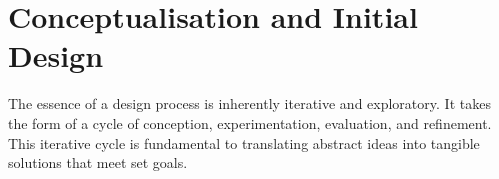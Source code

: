 \synopsisDesign
\mynewline
\section{Conceptualisation and Initial Design}
The essence of a design process is inherently iterative and exploratory. It takes the form of a cycle of conception, experimentation, evaluation, and refinement. This iterative cycle is fundamental to translating abstract ideas into tangible solutions that meet set goals.

